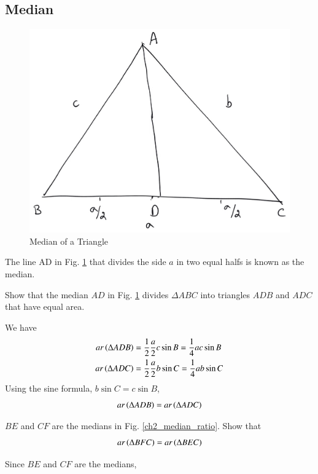 \subsection{Median}
\begin{figure}[!h]
	\begin{center}
		
		\includegraphics[width=\columnwidth]{./figs/ch2_median_def}
		\vspace*{-10cm}
	\end{center}
	\caption{Median of a Triangle}
	\label{ch2_median_def}	
\end{figure}
\begin{definition}
	The line AD in Fig. \ref{ch2_median_def} that divides the side $a$ in two equal halfs is known as the median.
\end{definition}
\begin{problem}
	Show that the median $AD$ in Fig. \ref{ch2_median_def} divides  $\Delta ABC$ into triangles $ADB$ and $ADC$ that have equal area.
\end{problem}
\proof We have
%
\begin{align}
ar \left(\Delta ADB\right) &= \frac{1}{2}\frac{a}{2}c \sin B =  \frac{1}{4}ac \sin B \\
ar \left(\Delta ADC\right) &= \frac{1}{2}\frac{a}{2}b \sin C =  \frac{1}{4}ab \sin C 
\end{align}
%
Using the sine formula, $b \sin C = c \sin B$,
\begin{equation}
ar \left(\Delta ADB\right) = ar \left(\Delta ADC\right)
\end{equation}
\begin{problem}
	$BE$ and $CF$ are the medians in Fig. \ref{ch2_median_ratio}.  Show that
	\begin{equation}
	ar \left(\Delta BFC\right) = ar \left(\Delta BEC\right)
	\end{equation} 
	\label{ch2_median_eq_tri}
\end{problem}
\proof Since $BE$ and $CF$ are the medians, 

